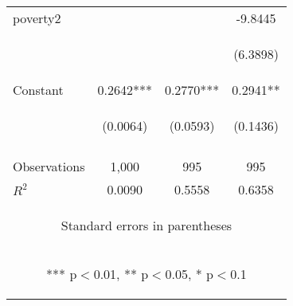 \begin{center}
\begin{tabular}{lccc}
poverty2 &  &  & -9.8445 \\
\vspace{4pt} & \begin{footnotesize}\end{footnotesize} & \begin{footnotesize}\end{footnotesize} & \begin{footnotesize}(6.3898)\end{footnotesize} \\
Constant & 0.2642*** & 0.2770*** & 0.2941** \\
 & \begin{footnotesize}(0.0064)\end{footnotesize} & \begin{footnotesize}(0.0593)\end{footnotesize} & \begin{footnotesize}(0.1436)\end{footnotesize} \\
\vspace{4pt} & \begin{footnotesize}\end{footnotesize} & \begin{footnotesize}\end{footnotesize} & \begin{footnotesize}\end{footnotesize} \\
Observations & 1,000 & 995 & 995 \\
 $R^2$ & 0.0090 & 0.5558 & 0.6358 \\ \hline
\multicolumn{4}{c}{\begin{footnotesize} Standard errors in parentheses\end{footnotesize}} \\
\multicolumn{4}{c}{\begin{footnotesize} *** p$<$0.01, ** p$<$0.05, * p$<$0.1\end{footnotesize}} \\
\end{tabular}
\end{center}
